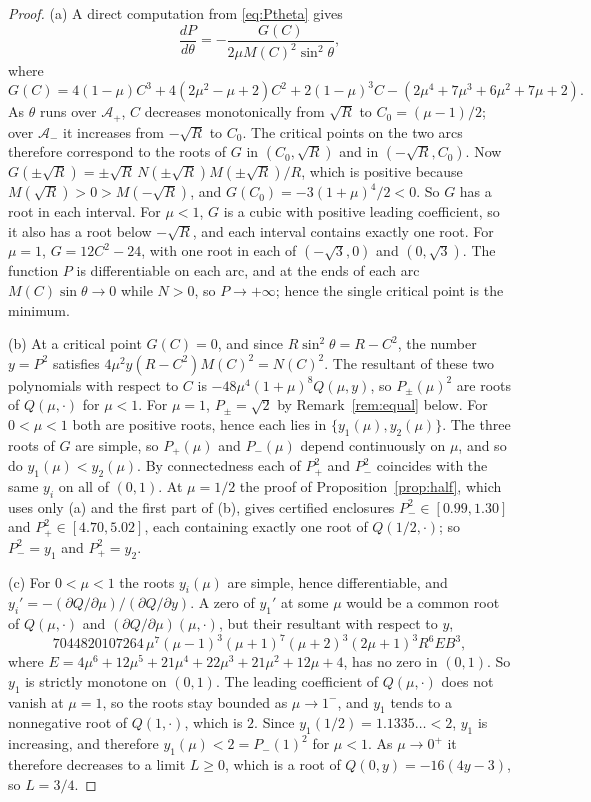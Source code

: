 \documentclass[11pt]{article}
\theoremstyle{definition}
\newcommand{\Ap}{\mathcal{A}_+}
\newcommand{\Am}{\mathcal{A}_-}
\begin{document}
\begin{proof}
(a) A direct computation from \eqref{eq:Ptheta} gives
\[
  \frac{dP}{d\theta} = -\frac{G(C)}{2\mu M(C)^2 \sin^2\theta},
\]
where
\begin{equation}\label{eq:K}
  G(C) = 4(1 - \mu) C^3 + 4(2\mu^2 - \mu + 2) C^2 + 2(1 - \mu)^3 C - (2\mu^4 + 7\mu^3 + 6\mu^2 + 7\mu + 2).
\end{equation}
As $\theta$ runs over $\Ap$, $C$ decreases monotonically from $\sqrt{R}$ to $C_0 = (\mu - 1)/2$; over $\Am$ it increases from $-\sqrt{R}$ to $C_0$. The critical points on the two arcs therefore correspond to the roots of $G$ in $(C_0, \sqrt{R})$ and in $(-\sqrt{R}, C_0)$. Now $G(\pm\sqrt{R}) = \pm\sqrt{R}\, N(\pm\sqrt{R}) M(\pm\sqrt{R})/R$, which is positive because $M(\sqrt{R}) > 0 > M(-\sqrt{R})$, and $G(C_0) = -3(1 + \mu)^4/2 < 0$. So $G$ has a root in each interval. For $\mu < 1$, $G$ is a cubic with positive leading coefficient, so it also has a root below $-\sqrt{R}$, and each interval contains exactly one root. For $\mu = 1$, $G = 12C^2 - 24$, with one root in each of $(-\sqrt{3}, 0)$ and $(0, \sqrt{3})$. The function $P$ is differentiable on each arc, and at the ends of each arc $M(C)\sin\theta \to 0$ while $N > 0$, so $P \to +\infty$; hence the single critical point is the minimum.

(b) At a critical point $G(C) = 0$, and since $R\sin^2\theta = R - C^2$, the number $y = P^2$ satisfies $4\mu^2 y (R - C^2) M(C)^2 = N(C)^2$. The resultant of these two polynomials with respect to $C$ is $-48\mu^4 (1 + \mu)^8 Q(\mu, y)$, so $P_\pm(\mu)^2$ are roots of $Q(\mu, \cdot)$ for $\mu < 1$. For $\mu = 1$, $P_\pm = \sqrt{2}$ by Remark~\ref{rem:equal} below. For $0 < \mu < 1$ both are positive roots, hence each lies in $\{y_1(\mu), y_2(\mu)\}$. The three roots of $G$ are simple, so $P_+(\mu)$ and $P_-(\mu)$ depend continuously on $\mu$, and so do $y_1(\mu) < y_2(\mu)$. By connectedness each of $P_+^2$ and $P_-^2$ coincides with the same $y_i$ on all of $(0, 1)$. At $\mu = 1/2$ the proof of Proposition~\ref{prop:half}, which uses only (a) and the first part of (b), gives certified enclosures $P_-^2 \in [0.99, 1.30]$ and $P_+^2 \in [4.70, 5.02]$, each containing exactly one root of $Q(1/2, \cdot)$; so $P_-^2 = y_1$ and $P_+^2 = y_2$.

(c) For $0 < \mu < 1$ the roots $y_i(\mu)$ are simple, hence differentiable, and $y_i' = -(\partial Q/\partial\mu)/(\partial Q/\partial y)$. A zero of $y_1'$ at some $\mu$ would be a common root of $Q(\mu, \cdot)$ and $(\partial Q/\partial\mu)(\mu, \cdot)$, but their resultant with respect to $y$,
\[
  7044820107264\, \mu^7 (\mu - 1)^3 (\mu + 1)^7 (\mu + 2)^3 (2\mu + 1)^3 R^6 E B^3,
\]
where $E = 4\mu^6 + 12\mu^5 + 21\mu^4 + 22\mu^3 + 21\mu^2 + 12\mu + 4$, has no zero in $(0, 1)$. So $y_1$ is strictly monotone on $(0, 1)$. The leading coefficient of $Q(\mu, \cdot)$ does not vanish at $\mu = 1$, so the roots stay bounded as $\mu \to 1^-$, and $y_1$ tends to a nonnegative root of $Q(1, \cdot)$, which is $2$. Since $y_1(1/2) = 1.1335\ldots < 2$, $y_1$ is increasing, and therefore $y_1(\mu) < 2 = P_-(1)^2$ for $\mu < 1$. As $\mu \to 0^+$ it therefore decreases to a limit $L \ge 0$, which is a root of $Q(0, y) = -16(4y - 3)$, so $L = 3/4$.
\end{proof}
\end{document}
